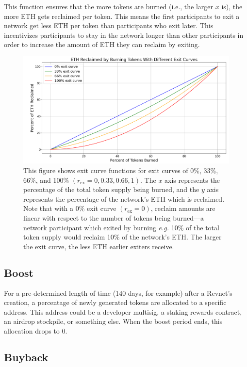 \documentclass{article}
\begin{document}
This function ensures that the more tokens are burned (i.e., the larger $x$ is), the more ETH gets reclaimed per token. This means the first participants to exit a network get less ETH per token than participants who exit later. This incentivizes participants to stay in the network longer than other participants in order to increase the amount of ETH they can reclaim by exiting.

\begin{figure}[ht]
  \centering
  \includegraphics[width=\textwidth]{figures/multi-exit-curves.png}
  \caption{This figure shows exit curve functions for exit curves of 0\%, 33\%, 66\%, and 100\% $(r_{\text{ex}} = 0, 0.33, 0.66, 1)$. The $x$ axis represents the percentage of the total token supply being burned, and the $y$ axis represents the percentage of the network's ETH which is reclaimed. Note that with a 0\% exit curve $(r_{\text{ex}} = 0)$, reclaim amounts are linear with respect to the number of tokens being burned---a network participant which exited by burning \textit{e.g.} 10\% of the total token supply would reclaim 10\% of the network's ETH. The larger the exit curve, the less ETH earlier exiters receive.}
\end{figure}

\subsection{Boost}

For a pre-determined length of time (140 days, for example) after a Revnet's creation, a percentage of newly generated tokens are allocated to a specific address. This address could be a developer multisig, a staking rewards contract, an airdrop stockpile, or something else. When the boost period ends, this allocation drops to 0.

\subsection{Buyback}
\end{document}
